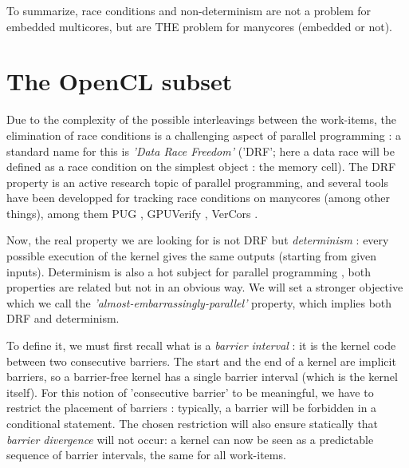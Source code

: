 \documentclass[a4paper,10pt]{article} %
\begin{document}
To summarize, race conditions and non-determinism are not a problem for embedded multicores, but are THE problem for manycores (embedded or not).



\begin{comment}

There seems to be an agreement \cite{narayanasamy2007automatically} \cite{burnim2009asserting}



where a thread reads a data which is updated simultaneously by another thread


This very last point is a key point : the software engineer will not be asked to master a formal language.
Instead he will state simple assertions, which reflect (ANGLAIS) his design intent.

almost-embarassingly parallel

le titre est un peu trompeur : the OpenCL subset means 2 things:
- syntactic subset
- a subset of the applications : ...

\end{comment}

\section{The OpenCL subset}

Due to the complexity of the possible interleavings between the work-items, the elimination of race conditions is a challenging aspect of parallel programming :
a standard name for this is \emph{'Data Race Freedom'} ('DRF'; here a data race will be defined as a race condition on the simplest object : the memory cell).
The DRF property is an active research topic of parallel programming, and several tools have been developped for tracking race conditions on manycores (among other things), among them PUG \cite{li2010scalable}, GPUVerify \cite{betts2012gpuverify}, VerCors \cite{blom2014vercors}.

Now, the real property we are looking for is not DRF but \emph{determinism} : every possible execution of the kernel gives the same outputs (starting from given inputs).
Determinism is also a hot subject for parallel programming \cite{burnim2009asserting}, both properties are related but not in an obvious way.
We will set a stronger objective which we call the \emph{'almost-embarrassingly-parallel'} property, which implies both DRF and determinism.

To define it, we must first recall what is a \emph{barrier interval}  : it is the kernel code between two consecutive barriers.
The start and the end of a kernel are implicit barriers, so a barrier-free kernel has a single barrier interval (which is the kernel itself).
For this notion of 'consecutive barrier' to be meaningful, we have to restrict the placement of barriers : typically, a barrier will be forbidden in a conditional statement.
The chosen restriction will also ensure statically that \emph{barrier divergence} will not occur: a kernel can now be seen as a predictable sequence of barrier intervals, the same for all work-items.
\end{document}
